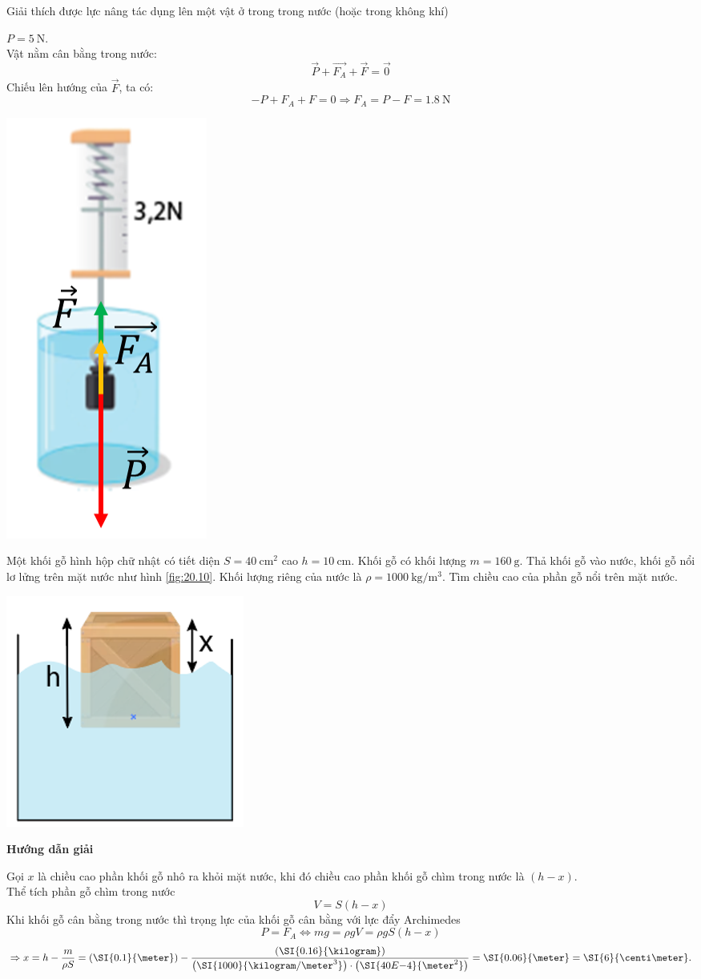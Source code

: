\begin{dang}{Giải thích được lực nâng tác dụng lên một vật ở trong trong nước (hoặc trong không khí)}
{\begin{enumerate}[label=\alph*)]
\begin{minipage}[l]{0.5\textwidth}
	$P=\SI{5}{\newton}$.\\
	Vật nằm cân bằng trong nước:
	$$\overrightarrow{P}+\overrightarrow{F_A}+\overrightarrow{F}=\vec{0}$$
	Chiếu lên hướng của $\overrightarrow{F}$, ta có:
	$$-P+F_A+F=0\Rightarrow F_A=P-F=\SI{1.8}{\newton}$$
	\end{minipage}
	\begin{minipage}{0.5\textwidth}
		\begin{center}
			\includegraphics[width=0.3\linewidth]{../figs/VN10-2023-PH-TP020-9}
		\end{center}
	\end{minipage}

\end{enumerate}
}
{Một khối gỗ hình hộp chữ nhật có tiết diện $S=\SI{40}{\centi\meter^2}$ cao $h=\SI{10}{\centi\meter}$. Khối gỗ có khối lượng $m=\SI{160}{\gram}$. Thả khối gỗ vào nước, khối gỗ nổi lơ lửng trên mặt nước như hình \ref{fig:20.10}. Khối lượng riêng của nước là $\rho=\SI{1000}{\kilogram/\meter^3}$. Tìm chiều cao của phần gỗ nổi trên mặt nước.
	\begin{center}
		\includegraphics[width=0.2\linewidth]{../figs/VN10-2023-PH-TP020-10}
		\label{fig:20.10}
	\end{center}
}
{\begin{center}
		\textbf{Hướng dẫn giải}
	\end{center}
Gọi $x$ là chiều cao phần khối gỗ nhô ra khỏi mặt nước, khi đó chiều cao phần khối gỗ chìm trong nước là $\left(h-x\right)$.\\
Thể tích phần gỗ chìm trong nước
$$V=S\left(h-x\right)$$
Khi khối gỗ cân bằng trong nước thì trọng lực của khối gỗ cân bằng với lực đẩy Archimedes
$$P=F_A\Leftrightarrow mg=\rho gV=\rho g S\left(h-x\right)$$
$$\Rightarrow x=h-\dfrac{m}{\rho S}=\left(\SI{0.1}{\meter}\right)-\dfrac{\left(\SI{0.16}{\kilogram}\right)}{\left(\SI{1000}{\kilogram/\meter^3}\right)\cdot\left(\SI{40E{-4}}{\meter^2}\right)}=\SI{0.06}{\meter}=\SI{6}{\centi\meter}.$$
}
\end{dang}